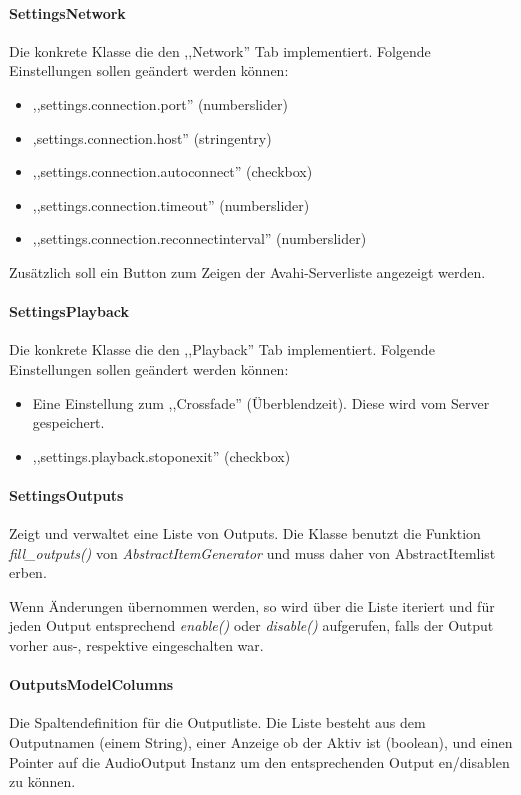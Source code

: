 \paragraph{SettingsNetwork}
Die konkrete Klasse die den ,,Network'' Tab implementiert.
Folgende Einstellungen sollen geändert werden können:
\begin{itemize}
\item ,,settings.connection.port'' (numberslider)
\item ,settings.connection.host'' (stringentry)
\item ,,settings.connection.autoconnect'' (checkbox)
\item ,,settings.connection.timeout'' (numberslider)
\item ,,settings.connection.reconnectinterval'' (numberslider)
\end{itemize}
Zusätzlich soll ein Button zum Zeigen der Avahi-Serverliste angezeigt werden.

\paragraph{SettingsPlayback}
Die konkrete Klasse die den ,,Playback'' Tab implementiert.
Folgende Einstellungen sollen geändert werden können:
\begin{itemize}
\item Eine Einstellung zum ,,Crossfade'' (Überblendzeit). Diese wird vom Server gespeichert.
\item ,,settings.playback.stoponexit'' (checkbox)
\end{itemize}

\paragraph{SettingsOutputs}
Zeigt und verwaltet eine Liste von Outputs. Die Klasse benutzt die Funktion \textit{fill\_outputs()} von \emph{AbstractItemGenerator}
und muss daher von AbstractItemlist erben.

Wenn Änderungen übernommen werden, so wird über die Liste iteriert und für jeden Output entsprechend \emph{enable()} oder \emph{disable()} aufgerufen, 
falls der Output vorher aus-, respektive eingeschalten war.

\paragraph{OutputsModelColumns}
Die Spaltendefinition für die Outputliste.
Die Liste besteht aus dem Outputnamen (einem String), einer Anzeige ob der Aktiv ist (boolean),
und einen Pointer auf die AudioOutput Instanz um den entsprechenden Output en/disablen zu können.

